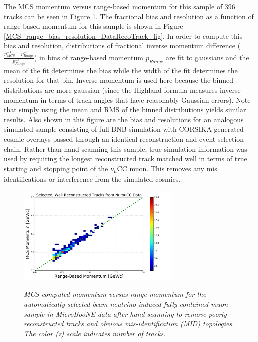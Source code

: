 \documentclass[a4paper,11pt]{article}
\begin{document}
The MCS momentum versus range-based momentum for this sample of 396 tracks can be seen in Figure \ref{realdata_goodhandscan_fig}. The fractional bias and resolution as a function of range-based momentum for this sample is shown in Figure \ref{MCS_range_bias_resolution_DataRecoTrack_fig}. In order to compute this bias and resolution, distributions of fractional inverse momentum difference ($\frac{p_{MCS}^{-1} - p_{Range}^{-1}}{p_{Range}^{-1}}$) in bins of range-based momentum $p_{Range}$ are fit to gaussians and the mean of the fit determines the bias while the width of the fit determines the resolution for that bin. Inverse momentum is used here because the binned distributions are more gaussian (since the Highland formula measures inverse momentum in terms of track angles that have reasonably Gaussian errors). Note that simply using the mean and RMS of the binned distributions yields similar results. Also shown in this figure are the bias and resolutions for an analogous simulated sample consisting of full BNB simulation with CORSIKA-generated \cite{corsika_ref} cosmic overlays passed through an identical reconstruction and event selection chain. Rather than hand scanning this sample, true simulation information was used by requiring the longest reconstructed track matched well in terms of true starting and stopping point of the $\nu_\mu$CC muon. This removes any mis identifications or interference from the simulated cosmics. 

\begin{figure}[ht!]
\centering
	\includegraphics[width=0.7\textwidth]{Figures/MCS_range_momentum_DataRecoTracks_goodhandscan.png} \\
\caption{\textit{MCS computed momentum versus range momentum for the automatically selected beam neutrino-induced fully contained muon sample in MicroBooNE data after hand scanning to remove poorly reconstructed tracks and obvious mis-identification (MID) topologies. The color (z) scale indicates number of tracks.}}\label{realdata_goodhandscan_fig}
\end{figure}
\end{document}
